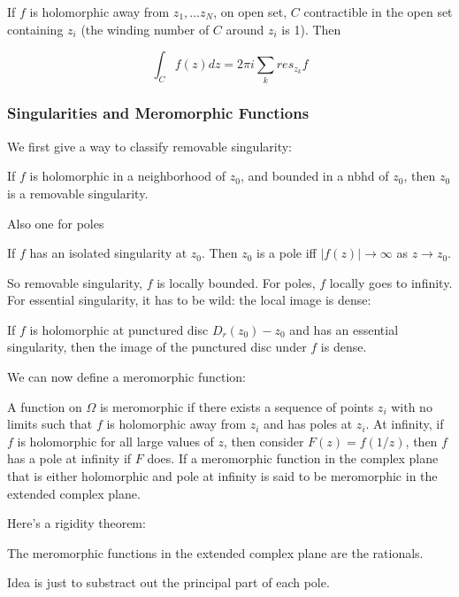 \documentclass[main.tex]{subfiles}
\begin{document}
\begin{theorem}
If $f$ is holomorphic away from $z_1, ... z_N$, on open set, $C$ contractible in the open set containing $z_i$ (the winding number of $C$ around $z_i$ is 1). Then 

$$
\int_C f(z) dz = 2\pi i \sum_k res_{z_k} f
$$
\end{theorem}

\subsubsection{Singularities and Meromorphic Functions}

We first give a way to classify removable singularity:

\begin{theorem}
If $f$ is holomorphic in a neighborhood of $z_0$, and bounded in a nbhd of $z_0$, then $z_0$ is a removable singularity. 
\end{theorem}

Also one for poles
\begin{corollary}
If $f$ has an isolated singularity at $z_0$. Then $z_0$ is a pole iff $|f(z)| \rightarrow \infty$ as $z \rightarrow z_0$.
\end{corollary}

So removable singularity, $f$ is locally bounded. For poles, $f$ locally goes to infinity. For essential singularity, it has to be wild: the local image is dense:

\begin{theorem}
If $f$ is holomorphic at punctured disc 
$D_r(z_0) - z_0$ and has an essential singularity, then the image of the punctured disc under $f$ is dense.
\end{theorem}

We can now define a meromorphic function:
\begin{definition}
A function on $\Omega$ is meromorphic if there exists a sequence of points $z_i$ with no limits such that $f$ is holomorphic away from $z_i$ and has poles at $z_i$. At infinity, if $f$ is holomorphic for all large values of $z$, then consider $F(z) = f(1/z)$, then $f$ has a pole at infinity if $F$ does. If a meromorphic function in the complex plane that is either holomorphic and pole at infinity is said to be meromorphic in the extended complex plane.
\end{definition}

Here's a rigidity theorem:
\begin{theorem}
The meromorphic functions in the extended complex plane are the rationals. 
\end{theorem}
Idea is just to substract out the principal part of each pole.
\end{document}
